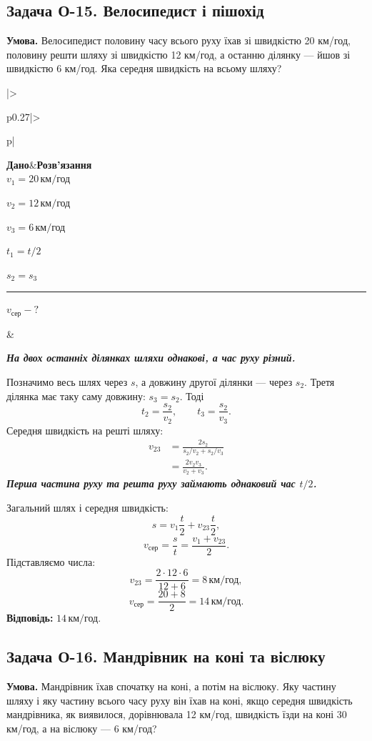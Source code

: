 \documentclass[12pt,a4paper]{article}
\newcommand{\target}[1]{\par\rule{\linewidth}{0.3pt}\par $#1-?$}
\newcommand{\why}[1]{\textbf{\textit{#1}}\par}
\newenvironment{solutiontwo}{\small\begin{tabular}{|>{\raggedright\arraybackslash}p{0.27\linewidth}|>{\raggedright\arraybackslash}p{\dimexpr0.73\linewidth-4\tabcolsep-3\arrayrulewidth\relax}|}\hline
\textbf{Дано}&\textbf{Розв'язання}\\\hline}{\\\hline\end{tabular}\par}
\begin{document}
\subsection*{Задача О-15. Велосипедист і пішохід}
\textbf{Умова.} Велосипедист половину часу всього руху їхав зі швидкістю 20 км/год, половину решти шляху зі швидкістю 12 км/год, а останню ділянку --- йшов зі швидкістю 6 км/год. Яка середня швидкість на всьому шляху?

\begin{solutiontwo}
$v_1=20\,\text{км/год}$\par
$v_2=12\,\text{км/год}$\par
$v_3=6\,\text{км/год}$\par
$t_1=t /2$\par
$s_2=s_3$
\target{v_{\text{сер}}}

&

\why{На двох останніх ділянках шляхи однакові, а час руху різний.}
Позначимо весь шлях через $s$, а довжину другої ділянки --- через $s_2$. Третя ділянка має таку саму довжину: $s_3=s_2$. Тоді
\[t_2=\frac{s_2}{v_2},\qquad t_3=\frac{s_2}{v_3}.\]
Середня швидкість на решті шляху:
\[
\begin{aligned}
v_{23}&=\frac{2s_2}{s_2/v_2+s_2/v_3}\\
&=\frac{2v_2v_3}{v_2+v_3}.
\end{aligned}
\]
\why{Перша частина руху та решта руху займають однаковий час $t /2$.}
Загальний шлях і середня швидкість:
\[s=v_1\frac{t }{2}+v_{23}\frac{t }{2},\]
\[v_{\text{сер}}=\frac{s}{t }=\frac{v_1+v_{23}}{2}.\]
Підставляємо числа:
\[v_{23}=\frac{2\cdot12\cdot6}{12+6}=8\,\text{км/год},\]
\[v_{\text{сер}}=\frac{20+8}{2}=14\,\text{км/год}.\]
\textbf{Відповідь:} $14\,\text{км/год}$.
\end{solutiontwo}
\newpage
\subsection*{Задача О-16. Мандрівник на коні та віслюку}
\textbf{Умова.} Мандрівник їхав спочатку на коні, а потім на віслюку. Яку частину шляху і яку частину всього часу руху він їхав на коні, якщо середня швидкість мандрівника, як виявилося, дорівнювала 12 км/год, швидкість їзди на коні 30 км/год, а на віслюку --- 6 км/год?
\end{document}
